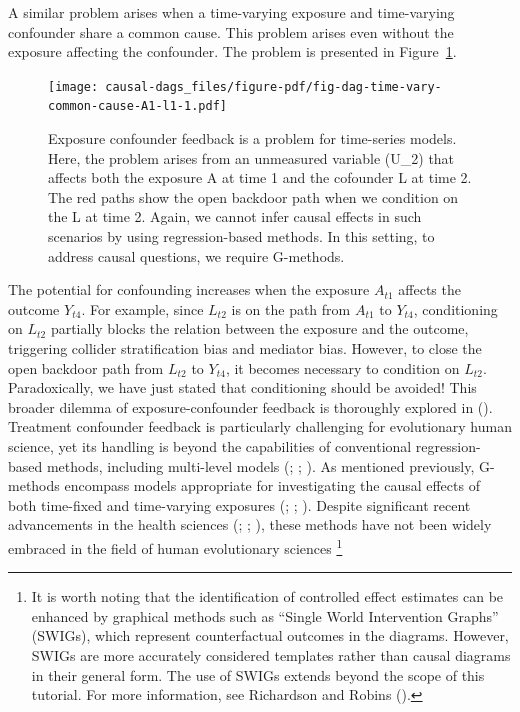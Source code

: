 \documentclass[
  singlecolumn,
  9pt]{article}
\begin{document}
A similar problem arises when a time-varying exposure and time-varying
confounder share a common cause. This problem arises even without the
exposure affecting the confounder. The problem is presented in
Figure~\ref{fig-dag-time-vary-common-cause-A1-l1}.

\begin{figure}

{\centering \texttt{[image: causal-dags\_files/figure-pdf/fig-dag-time-vary-common-cause-A1-l1-1.pdf]}

}

\caption{\label{fig-dag-time-vary-common-cause-A1-l1}Exposure confounder
feedback is a problem for time-series models. Here, the problem arises
from an unmeasured variable (U\_2) that affects both the exposure A at
time 1 and the cofounder L at time 2. The red paths show the open
backdoor path when we condition on the L at time 2. Again, we cannot
infer causal effects in such scenarios by using regression-based
methods. In this setting, to address causal questions, we require
G-methods.}

\end{figure}

The potential for confounding increases when the exposure \(A_{t1}\)
affects the outcome \(Y_{t4}\). For example, since \(L_{t2}\) is on the
path from \(A_{t1}\) to \(Y_{t4}\), conditioning on \(L_{t2}\) partially
blocks the relation between the exposure and the outcome, triggering
collider stratification bias and mediator bias. However, to close the
open backdoor path from \(L_{t2}\) to \(Y_{t4}\), it becomes necessary
to condition on \(L_{t2}\). Paradoxically, we have just stated that
conditioning should be avoided! This broader dilemma of
exposure-confounder feedback is thoroughly explored in
(). Treatment
confounder feedback is particularly challenging for evolutionary human
science, yet its handling is beyond the capabilities of conventional
regression-based methods, including multi-level models
(;
;
). As mentioned
previously, G-methods encompass models appropriate for investigating the
causal effects of both time-fixed and time-varying exposures
(;
;
). Despite significant
recent advancements in the health sciences
(;
;
), these methods have
not been widely embraced in the field of human evolutionary sciences
\footnote{It is worth noting that the identification of controlled
  effect estimates can be enhanced by graphical methods such as ``Single
  World Intervention Graphs'' (SWIGs), which represent counterfactual
  outcomes in the diagrams. However, SWIGs are more accurately
  considered templates rather than causal diagrams in their general
  form. The use of SWIGs extends beyond the scope of this tutorial. For
  more information, see Richardson and Robins
  ().}
\end{document}
